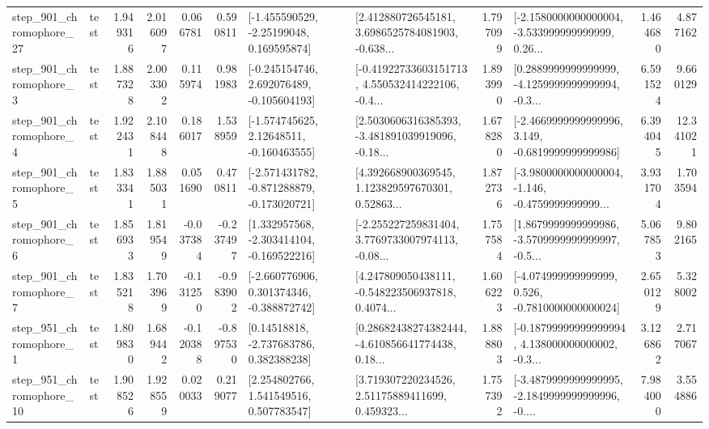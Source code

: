 \begin{tabular}{llrrrrllrlrr}
  step\_901\_chromophore\_27 &      test &      1.949316 &    2.016097 &      0.066781 &  0.590811 &    [-1.455590529, -2.25199048, 0.169595874] &  [2.412880726545181, 3.6986525784081903, -0.638... &       1.797099 &  [-2.1580000000000004, -3.533999999999999, 0.26... &            1.464680 &          4.877162 \\
   step\_901\_chromophore\_3 &      test &      1.887328 &    2.003302 &      0.115974 &  0.981983 &   [-0.245154746, 2.692076489, -0.105604193] &  [-0.41922733603151713, 4.550532414222106, -0.4... &       1.893990 &  [0.2889999999999999, -4.1259999999999994, -0.3... &            6.591524 &          9.660129 \\
   step\_901\_chromophore\_4 &      test &      1.922431 &    2.108448 &      0.186017 &  1.538959 &    [-1.574745625, 2.12648511, -0.160463555] &  [2.5030606316385393, -3.481891039919096, -0.18... &       1.678280 &  [-2.4669999999999996, 3.149, -0.6819999999999986] &            6.394045 &         12.341021 \\
   step\_901\_chromophore\_5 &      test &      1.833341 &    1.885031 &      0.051690 &  0.470811 &  [-2.571431782, -0.871288879, -0.173020721] &  [4.392668900369545, 1.123829597670301, 0.52863... &       1.872736 &  [-3.9800000000000004, -1.146, -0.4759999999999... &            3.931704 &          1.703594 \\
   step\_901\_chromophore\_6 &      test &      1.856933 &    1.819549 &     -0.037384 & -0.237497 &   [1.332957568, -2.303414104, -0.169522216] &  [-2.255227259831404, 3.7769733007974113, -0.08... &       1.757584 &  [1.8679999999999986, -3.5709999999999997, -0.5... &            5.067853 &          9.802165 \\
   step\_901\_chromophore\_7 &      test &      1.835218 &    1.703969 &     -0.131250 & -0.983902 &   [-2.660776906, 0.301374346, -0.388872742] &  [4.247809050438111, -0.548223506937818, 0.4074... &       1.606223 &   [-4.074999999999999, 0.526, -0.7810000000000024] &            2.650129 &          5.328002 \\
   step\_951\_chromophore\_1 &      test &      1.809830 &    1.689442 &     -0.120388 & -0.897530 &     [0.14518818, -2.737683786, 0.382388238] &  [0.28682438274382444, -4.610856641774438, 0.18... &       1.888803 &  [-0.18799999999999994, 4.138000000000002, -0.3... &            3.126862 &          2.717067 \\
  step\_951\_chromophore\_10 &      test &      1.908526 &    1.928559 &      0.020033 &  0.219077 &     [2.254802766, 1.541549516, 0.507783547] &  [3.719307220234526, 2.51175889411699, 0.459323... &       1.757392 &  [-3.4879999999999995, -2.1849999999999996, -0.... &            7.984000 &          3.554886 \\

\end{tabular}
